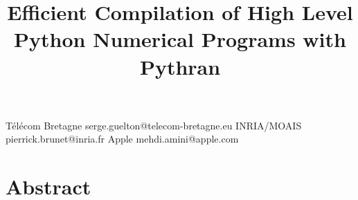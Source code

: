 \documentclass[10pt, preprint, nocopyrightspace]{sigplanconf}
\begin{document}
\title{Efficient Compilation of High Level Python Numerical Programs with Pythran}

{T{\'e}l{\'e}com Bretagne}
{serge.guelton@telecom-bretagne.eu}
{INRIA/MOAIS}
{pierrick.brunet@inria.fr}
{Apple}
{mehdi.amini@apple.com}

\maketitle

%
%
%
%
%
%

\section*{Abstract}
\end{document}
